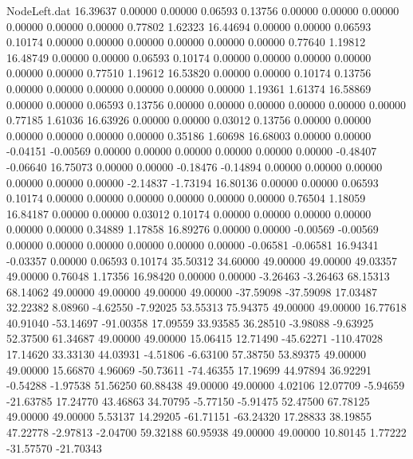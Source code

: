 \begin{filecontents}{NodeLeft.dat}
  16.39637    0.00000    0.00000     0.06593    0.13756    0.00000    0.00000    0.00000    0.00000    0.00000    0.00000    0.77802    1.62323
  16.44694    0.00000    0.00000     0.06593    0.10174    0.00000    0.00000    0.00000    0.00000    0.00000    0.00000    0.77640    1.19812
  16.48749    0.00000    0.00000     0.06593    0.10174    0.00000    0.00000    0.00000    0.00000    0.00000    0.00000    0.77510    1.19612
  16.53820    0.00000    0.00000     0.10174    0.13756    0.00000    0.00000    0.00000    0.00000    0.00000    0.00000    1.19361    1.61374
  16.58869    0.00000    0.00000     0.06593    0.13756    0.00000    0.00000    0.00000    0.00000    0.00000    0.00000    0.77185    1.61036
  16.63926    0.00000    0.00000     0.03012    0.13756    0.00000    0.00000    0.00000    0.00000    0.00000    0.00000    0.35186    1.60698
  16.68003    0.00000    0.00000    -0.04151   -0.00569    0.00000    0.00000    0.00000    0.00000    0.00000    0.00000   -0.48407   -0.06640
  16.75073    0.00000    0.00000    -0.18476   -0.14894    0.00000    0.00000    0.00000    0.00000    0.00000    0.00000   -2.14837   -1.73194
  16.80136    0.00000    0.00000     0.06593    0.10174    0.00000    0.00000    0.00000    0.00000    0.00000    0.00000    0.76504    1.18059
  16.84187    0.00000    0.00000     0.03012    0.10174    0.00000    0.00000    0.00000    0.00000    0.00000    0.00000    0.34889    1.17858
  16.89276    0.00000    0.00000    -0.00569   -0.00569    0.00000    0.00000    0.00000    0.00000    0.00000    0.00000   -0.06581   -0.06581
  16.94341   -0.03357    0.00000     0.06593    0.10174   35.50312   34.60000   49.00000   49.00000   49.03357   49.00000    0.76048    1.17356
  16.98420    0.00000    0.00000    -3.26463   -3.26463   68.15313   68.14062   49.00000   49.00000   49.00000   49.00000  -37.59098  -37.59098
  17.03487   32.22382    8.08960    -4.62550   -7.92025   53.55313   75.94375   49.00000   49.00000   16.77618   40.91040  -53.14697  -91.00358
  17.09559   33.93585   36.28510    -3.98088   -9.63925   52.37500   61.34687   49.00000   49.00000   15.06415   12.71490  -45.62271 -110.47028
  17.14620   33.33130   44.03931    -4.51806   -6.63100   57.38750   53.89375   49.00000   49.00000   15.66870    4.96069  -50.73611  -74.46355
  17.19699   44.97894   36.92291    -0.54288   -1.97538   51.56250   60.88438   49.00000   49.00000    4.02106   12.07709   -5.94659  -21.63785
  17.24770   43.46863   34.70795    -5.77150   -5.91475   52.47500   67.78125   49.00000   49.00000    5.53137   14.29205  -61.71151  -63.24320
  17.28833   38.19855   47.22778    -2.97813   -2.04700   59.32188   60.95938   49.00000   49.00000   10.80145    1.77222  -31.57570  -21.70343

\end{filecontents}
